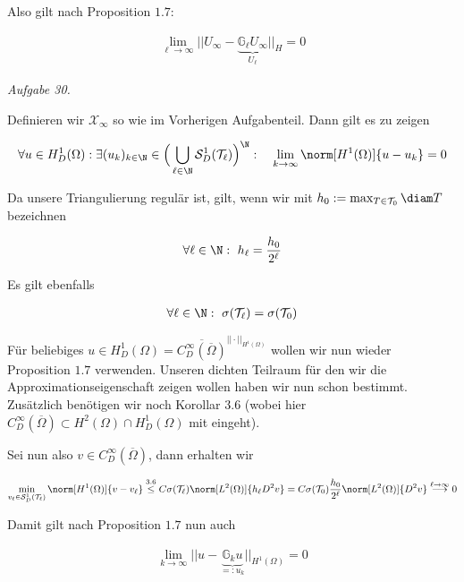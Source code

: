 \begin{solution}
Also gilt nach Proposition $1.7$:

\begin{align*}
  \lim_{\ell \to \infty} ||U_\infty - \underbrace{\mathbb{G}_\ell U_\infty}_{U_\ell}||_H
  =
  0
\end{align*}

\textit{Aufgabe 30.}

Definieren wir $\mathcal{X}_\infty$ so wie im Vorherigen Aufgabenteil. Dann gilt es zu zeigen

\begin{align*}
  \forall u \in H^1_D(\Omega):
  \exists (u_k)_{k \in \N} \in \Big(\bigcup_{\ell \in \N} \mathcal{S}^1_D(\mathcal{T}_\ell)\Big)^\N:
  \quad
  \lim_{k \to \infty} \norm[H^1(\Omega)]{u - u_k} = 0
\end{align*}

Da unsere Triangulierung regulär ist, gilt, wenn wir mit $h_0 := \max_{T \in \mathcal{T}_0} \diam T$ bezeichnen

\begin{align*}
  \forall \ell \in \N:~
  h_\ell
  =
  \frac{h_0}{2^\ell}
\end{align*}

Es gilt ebenfalls

\begin{align*}
  \forall \ell \in \N:~
  \sigma(\mathcal{T}_\ell) = \sigma(\mathcal{T}_0)
\end{align*}

Für beliebiges $u \in H^1_D(\Omega) = \overline{C^\infty_D(\overline{\Omega})}^{||\cdot||_{H^1(\Omega)}}$ wollen wir nun wieder Proposition $1.7$ verwenden. Unseren dichten Teilraum für den wir die Approximationseigenschaft zeigen wollen haben wir nun schon bestimmt. Zusätzlich benötigen wir noch Korollar $3.6$ (wobei hier $C^\infty_D(\overline{\Omega}) \subset H^2(\Omega) \cap H^1_D(\Omega)$ mit eingeht).


Sei nun also $v \in C^\infty_D(\overline{\Omega})$, dann erhalten wir

\begin{align*}
  \min_{v_\ell \in \mathcal{S}^1_D(\mathcal{T}_\ell)} \norm[H^1(\Omega)]{v - v_\ell}
  \stackrel{3.6}{\leq}
  C \sigma(\mathcal{T}_\ell)\norm[L^2(\Omega)]{h_\ell D^2v}
  =
  C \sigma(\mathcal{T}_0) \frac{h_0}{2^\ell} \norm[L^2(\Omega)]{D^2v}
  \stackrel{\ell \to \infty}{\longrightarrow}
  0
\end{align*}

Damit gilt nach Proposition $1.7$ nun auch

\begin{align*}
  \lim_{k \to \infty} ||u - \underbrace{\mathbb{G}_ku}_{=:u_k}||_{H^1(\Omega)} = 0
\end{align*}
\end{solution}

